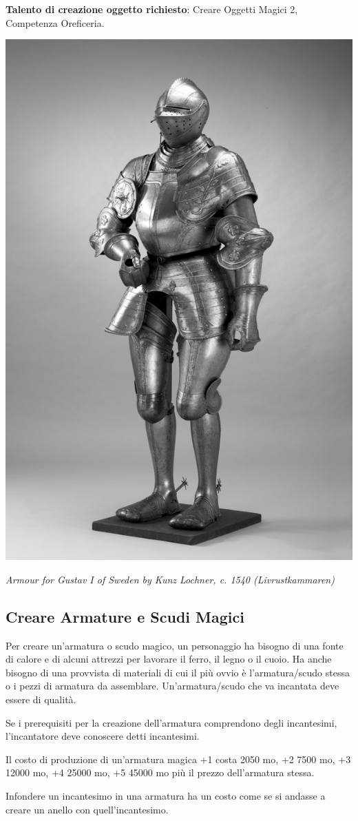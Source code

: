 \begin{multicols}{2}
\medskip

\textbf{Talento di creazione oggetto richiesto}: Creare Oggetti Magici 2, Competenza Oreficeria.


\begin{center}
	\includegraphics[width=0.55\linewidth]{immagini/Rustning_Gustav_Vasa.png}

	\emph{Armour for Gustav I of Sweden by Kunz Lochner, c. 1540 (Livrustkammaren)}
\end{center}

\subsection{Creare Armature e Scudi Magici}\label{crearearmaturemagiche}

Per creare un'armatura o scudo magico, un personaggio ha bisogno di una fonte di calore e di alcuni attrezzi per lavorare il ferro, il legno o il cuoio. Ha anche bisogno di una provvista di materiali di cui il più ovvio è l'armatura/scudo stessa o i pezzi di armatura da assemblare. Un'armatura/scudo che va incantata deve essere di qualità.


Se i prerequisiti per la creazione dell'armatura comprendono degli incantesimi, l'incantatore deve conoscere detti incantesimi.

Il costo di produzione di un'armatura magica +1 costa 2050 mo, +2 7500 mo, +3 12000 mo, +4 25000 mo, +5 45000 mo più il prezzo dell'armatura stessa.

Infondere un incantesimo in una armatura ha un costo come se si andasse a creare un anello con quell'incantesimo.


\end{multicols}
